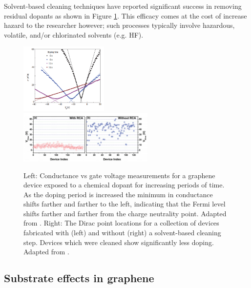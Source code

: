 \documentclass[edeposit,fullpage,draftthesis]{uiucthesis2009}
\begin{document}
        Solvent-based cleaning techniques have reported significant success in removing residual dopants 
        \cite{liang2011toward} as shown in Figure \ref{fig:chemical_doping}. This efficacy comes at
        the cost of increase hazard to the researcher however;
        such processes typically involve hazardous, volatile, and/or chlorinated solvents (e.g. HF).
        
            \begin{figure}
            \centering
            \includegraphics[width=0.39\textwidth]{images/background/gate_sweep_doping.png}
            \includegraphics[width=0.6\textwidth]{images/background/rca_clean.png}
            \caption[Conductance vs gate voltage after chemical doping]{
            Left: Conductance vs gate voltage measurements for a graphene device exposed to a 
            chemical dopant for increasing periods of time. As the doping period is increased
            the minimum in conductance shifts farther and farther to the left, indicating that
            the Fermi level shifts farther and farther from the charge neutrality point.
            Adapted from \cite{chen2008charged}.
            Right: The Dirac point locations for a collection of devices fabricated with (left)
            and without (right) a solvent-based cleaning step. Devices which were cleaned show 
            significantly less doping.
            Adapted from \cite{liang2011toward}.
            }
            \label{fig:chemical_doping}
            \end{figure}
    
        \subsection{Substrate effects in graphene}
        \label{sec:bg:substrates}
        
\end{document}
